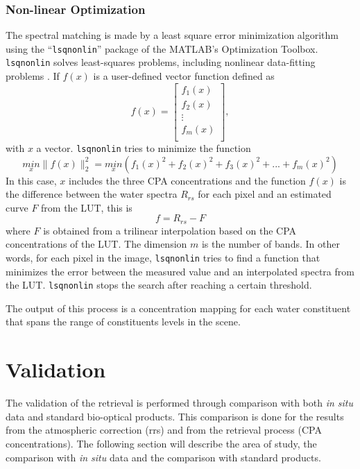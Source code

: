 \subsubsection{Non-linear Optimization}
The spectral matching is made by a least square error minimization algorithm using the ``\texttt{lsqnonlin}'' package of the MATLAB's Optimization Toolbox. \texttt{lsqnonlin} solves least-squares problems, including nonlinear data-fitting problems \citep{MatlabHelp}. If $f(x)$ is a user-defined vector function defined as
\begin{equation}
  f(x)=
  \left[
    \begin{array}{c}
      f_1(x) \\
      f_2(x) \\
      \vdots \\
      f_m(x) \\
    \end{array}
  \right],
\end{equation}
with $x$ a vector. \texttt{lsqnonlin} tries to minimize the function
\begin{equation}
  \underset{x}{min}\parallel f(x) \parallel^2_2=\underset{x}{min}(f_1(x)^2+f_2(x)^2+f_3(x)^2+...+f_m(x)^2)
\end{equation}
In this case, $x$ includes the three CPA concentrations and the function $f(x)$ is the difference between the water spectra $R_{rs}$ for each pixel and an estimated curve $F$ from the LUT, this is
\begin{equation}
  f = R_{rs} - F
\end{equation}
where $F$ is obtained from a trilinear interpolation based on the CPA concentrations of the LUT. The dimension $m$ is the number of bands. In other words, for each pixel in the image, \texttt{lsqnonlin} tries to find a function that minimizes the error between the measured value and an interpolated spectra from the LUT. \texttt{lsqnonlin} stops the search after reaching a certain threshold. 

The output of this process is a concentration mapping for each water constituent that spans the range of constituents levels in the scene. 


\section{Validation} 
\label{sec:val}

The validation of the retrieval is performed through comparison with both {\it in situ} data and standard bio-optical products. This comparison is done for the results from the atmospheric correction (\gls{rrs}) and from the retrieval process (CPA concentrations). The following section will describe the area of study, the comparison with {\it in situ} data and the comparison with standard products.
